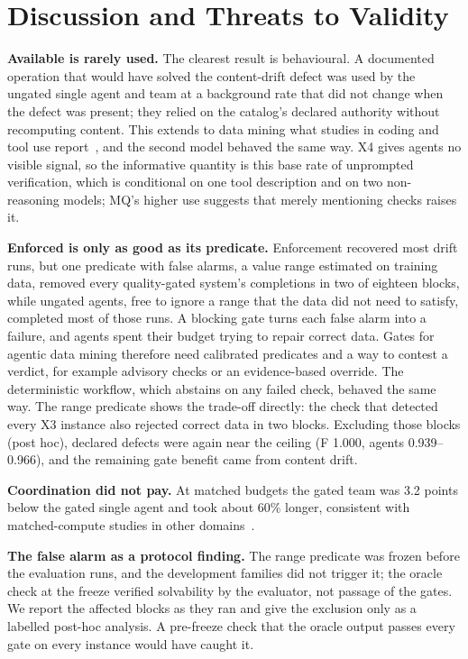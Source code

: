 \documentclass[conference]{IEEEtran}
\newcommand{\sys}[1]{\textsf{#1}}
\begin{document}
\section{Discussion and Threats to Validity}
\label{sec:discussion}
\textbf{Available is rarely used.} The clearest result is behavioural. A documented operation that would have
solved the content-drift defect was used by the ungated single agent and team at a background rate that did not
change when the defect was present; they relied on the catalog's declared authority without recomputing content. This
extends to data mining what studies in coding and tool use report~\cite{zhang2026rite,zhang2026rethinking}, and the
second model behaved the same way. X4 gives agents no visible signal, so the informative quantity is this base rate of
unprompted verification, which is conditional on one tool description and on two non-reasoning models; \sys{MQ}'s
higher use suggests that merely mentioning checks raises it.

\textbf{Enforced is only as good as its predicate.} Enforcement recovered most drift runs, but one predicate
with false alarms, a value range estimated on training data, removed every quality-gated system's completions in two
of eighteen blocks, while ungated agents, free to ignore a range that the data did not need to satisfy, completed most of
those runs. A blocking gate turns each false alarm into a failure, and agents spent their budget trying to repair
correct data. Gates for agentic data mining therefore need calibrated predicates and a way to contest a verdict, for
example advisory checks or an evidence-based override. The deterministic workflow, which abstains on any failed
check, behaved the same way. The range predicate shows the trade-off directly: the check that detected every X3
instance also rejected correct data in two blocks. Excluding those blocks (post hoc), declared defects were again near
the ceiling (\sys{F} 1.000, agents 0.939--0.966), and the remaining gate benefit came from content drift.

\textbf{Coordination did not pay.} At matched budgets the gated team was 3.2 points below the gated single agent and
took about 60\% longer, consistent with matched-compute studies in other domains~\cite{tran2026single,dylan2026equalcost}.

\textbf{The false alarm as a protocol finding.} The range predicate was frozen before the evaluation runs, and the
development families did not trigger it; the oracle check at the freeze verified solvability by the evaluator, not
passage of the gates. We report the affected blocks as they ran and give the exclusion only as a labelled post-hoc
analysis. A pre-freeze check that the oracle output passes every gate on every instance would have caught it.
\end{document}
